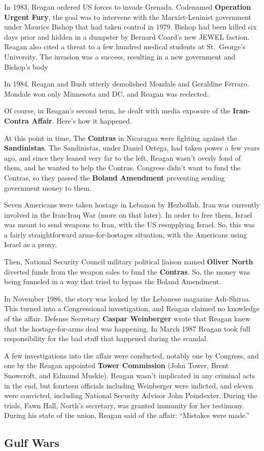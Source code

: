 In 1983, Reagan ordered US forces to invade Grenada.
Codenamed \textbf{Operation Urgent Fury},
the goal was to intervene with the Marxist-Leninist government under Maurice Bishop that had taken control in 1979.
Bishop had been killed six days prior and hidden in a dumpster by Bernard Coard's new JEWEL faction.
Reagan also cited a threat to a few hundred medical students at St.\ George's University.
The invasion was a success, resulting in a new government and Bishop's body

In 1984, Reagan and Bush utterly demolished Mondale and Geraldine Ferraro.
Mondale won only Minnesota and DC, and Reagan was reelected.

Of course, in Reagan's second term, he dealt with media exposure of the \textbf{Iran-Contra Affair}.
Here's how it happened.

At this point in time, The \textbf{Contras} in Nicaragua were fighting against the \textbf{Sandinistas}.
The Sandinistas, under Daniel Ortega, had taken power a few years ago,
and since they leaned very far to the left,
Reagan wasn't overly fond of them, and he wanted to help the Contras.
Congress didn't want to fund the Contras,
so they passed the \textbf{Boland Amendment} preventing sending government money to them.

Seven Americans were taken hostage in Lebanon by Hezbollah.
Iran was currently involved in the Iran-Iraq War (more on that later).
In order to free them, Israel was meant to send weapons to Iran, with the US resupplying Israel.
So, this was a fairly straightforward arms-for-hostages situation, with the Americans using Israel as a proxy.

Then, National Security Council military political liaison named \textbf{Oliver North}
diverted funds from the weapon sales to fund the \textbf{Contras}.
So, the money was being funneled in a way that tried to bypass the Boland Amendment.

In November 1986, the story was leaked by the Lebanese magazine Ash-Shiraa.
This turned into a Congressional investigation, and Reagan claimed no knowledge of the affair.
Defense Secretary \textbf{Caspar Weinberger} wrote that Reagan knew that the hostage-for-arms deal was happening,
In March 1987 Reagan took full responsibility for the bad stuff that happened during the scandal.

A few investigations into the affair were conducted, notably one by Congress,
and one by the Reagan appointed \textbf{Tower Commission} (John Tower, Brent Snowcroft, and Edmund Muskie).
Reagan wasn't implicated in any criminal acts in the end,
but fourteen officials including Weinberger were indicted, and eleven were convicted,
including National Security Advisor John Poindexter.
During the trials, Fawn Hall, North's secretary, was granted immunity for her testimony.
During his state of the union, Reagan said of the affair: ``Mistakes were made.''

\subsection*{Gulf Wars}
